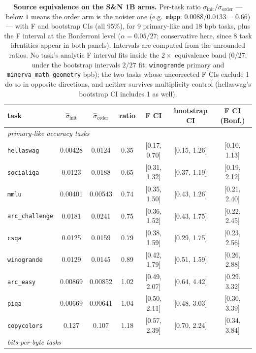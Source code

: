 \begin{table}[!htbp]
\centering
\caption{\textbf{Source equivalence on the S\&N 1B arms.} Per-task ratio
$\sigma_{\mathrm{init}}/\sigma_{\mathrm{order}}$ --- below $1$ means the order arm is the
noisier one (e.g.\ \texttt{mbpp}: $0.0088/0.0133 = 0.66$) --- with F and bootstrap CIs (all 95\%), for 9 primary-like
and 18 bpb tasks, plus the F interval at the Bonferroni level ($\alpha = 0.05/27$;
conservative here, since 8 task identities appear in both panels). Intervals are computed from the unrounded ratios. No task's analytic F
interval fits inside
the $2\times$ equivalence band ($0/27$; under the bootstrap intervals $2/27$ fit:
\texttt{winogrande} primary and \texttt{minerva\_math\_geometry} bpb); the two tasks whose uncorrected F CIs exclude 1 do so in opposite directions, and
neither survives multiplicity control (hellaswag's bootstrap CI includes 1 as well).}
\label{tab:t2}
\scriptsize
\setlength{\tabcolsep}{3pt}
\begin{tabular}{@{}lcccccc@{}}
\toprule
task & $\hat\sigma_{\mathrm{init}}$ & $\hat\sigma_{\mathrm{order}}$ & ratio &
F CI & bootstrap CI & F CI (Bonf.) \\
\midrule
\multicolumn{7}{l}{\emph{primary-like accuracy tasks}}\\
\midrule
\texttt{hellaswag} & 0.00428 & 0.0124 & 0.35 & [0.17, 0.70] & [0.15, 1.26] & [0.10, 1.13] \\
\texttt{socialiqa} & 0.0123 & 0.0188 & 0.65 & [0.31, 1.32] & [0.37, 1.19] & [0.19, 2.12] \\
\texttt{mmlu} & 0.00401 & 0.00543 & 0.74 & [0.35, 1.50] & [0.43, 1.26] & [0.21, 2.40] \\
\texttt{arc\_challenge} & 0.0181 & 0.0241 & 0.75 & [0.36, 1.52] & [0.43, 1.75] & [0.22, 2.45] \\
\texttt{csqa} & 0.0125 & 0.0159 & 0.79 & [0.38, 1.59] & [0.29, 1.75] & [0.23, 2.56] \\
\texttt{winogrande} & 0.0129 & 0.0145 & 0.89 & [0.42, 1.79] & [0.51, 1.59] & [0.26, 2.88] \\
\texttt{arc\_easy} & 0.00869 & 0.00852 & 1.02 & [0.49, 2.07] & [0.64, 4.42] & [0.29, 3.32] \\
\texttt{piqa} & 0.00669 & 0.00641 & 1.04 & [0.50, 2.11] & [0.48, 3.03] & [0.30, 3.39] \\
\texttt{copycolors} & 0.127 & 0.107 & 1.18 & [0.57, 2.39] & [0.70, 2.24] & [0.34, 3.84] \\
\midrule
\multicolumn{7}{l}{\emph{bits-per-byte tasks}}\\

\end{tabular}
\end{table}
